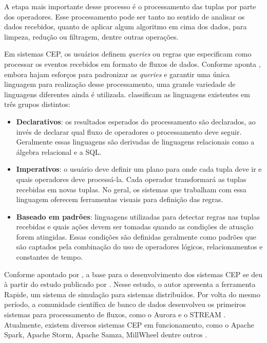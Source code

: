 A etapa mais importante desse processo é o processamento das tuplas por parte dos operadores. Esse processamento pode ser tanto no sentido de analisar os dados recebidos, quanto de aplicar algum algoritmo em cima dos dados, para limpeza, redução ou filtragem, dentre
outras operações.

Em sistemas CEP, os usuários definem \textit{queries} ou regras que especificam como processar os eventos recebidos em formato de fluxos de dados. Conforme aponta , embora hajam esforços para padronizar as \textit{queries} e garantir uma única linguagem para realização desse processamento, uma grande variedade de linguagens diferentes ainda é utilizada.  classificam as linguagens existentes em três grupos distintos:

\begin{itemize}
\item \textbf{Declarativos}: os resultados esperados do processamento são declarados, ao invés de declarar qual fluxo de operadores o processamento deve seguir. Geralmente essas linguagens são derivadas de linguagens relacionais como a álgebra relacional e a SQL.

\item \textbf{Imperativos}: o usuário deve definir um plano para onde cada tupla deve ir e quais operadores deve processá-la. Cada operador transformará as tuplas recebidas em novas tuplas. No geral, os sistemas que trabalham com essa linguagem oferecem ferramentas visuais para definição das regras.

\item \textbf{Baseado em padrões}: linguagens utilizadas para detectar regras nas tuplas recebidas e quais ações devem ser tomadas quando as condições de atuação forem atingidas. Essas condições são definidas geralmente como padrões que são captados pela combinação do uso de operadores lógicos, relacionamentos e constantes de tempo. 
\end{itemize}


Conforme apontado por , a base para o desenvolvimento dos sistemas CEP se deu à partir do estudo publicado por .
Nesse estudo, o autor apresenta a ferramenta Rapide, um sistema de simulação para sistemas distribuídos. Por volta do mesmo período, a comunidade científica de banco de dados desenvolveu os primeiros sistemas para processamento de fluxos, como o Aurora \cite{Carney2003} e o STREAM \cite{Arasu2004}. Atualmente, existem diversos sistemas CEP em funcionamento, como o Apache Spark, Apache Storm, Apache Samza, MillWheel dentre outros \cite{Gradvohl2014}.


